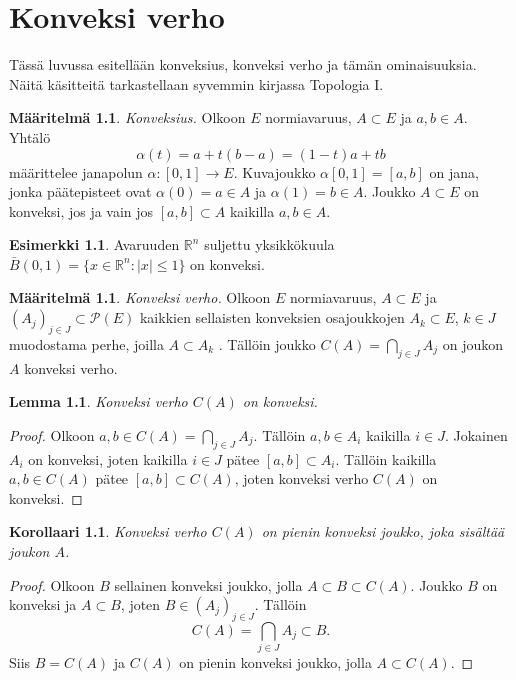 \documentclass[12pt,a4paper,leqno]{report}
\newcommand{\R}{\mathbb{R}}
\theoremstyle{plain}
\newtheorem{lem}[equation]{Lemma}
\newtheorem{kor}[equation]{Korollaari}
\theoremstyle{definition}
\newtheorem{maar}[equation]{Määritelmä}
\newtheorem{esim}[equation]{Esimerkki}
\theoremstyle{remark}
\begin{document}
\chapter{Konveksi verho}\label{konverho}
Tässä luvussa esitellään konveksius, konveksi verho ja tämän ominaisuuksia. Näitä käsitteitä tarkastellaan syvemmin kirjassa Topologia I.
\begin{maar}%
\emph{Konveksius.}
 Olkoon $E$ normiavaruus, $A\subset E$ ja $a,b\in A$. Yhtälö 
$$\alpha (t)=a+t(b-a)=(1-t)a+tb$$ 
määrittelee janapolun $\alpha \colon [0,1]\rightarrow E$. Kuvajoukko $\alpha [0,1] = [a,b]$ on jana, jonka päätepisteet ovat $\alpha (0)=a\in A$ ja $\alpha (1)=b\in A$. 
Joukko $A\subset E$ on konveksi, jos ja vain jos $[a,b]\subset A$ kaikilla $a,b\in A$.
\end{maar}
\begin{esim}
Avaruuden $\R ^n$ suljettu yksikkökuula $ \bar B(0,1)= \{x\in \R ^n \colon |x|\leq 1\}$ on konveksi.
\end{esim}
\begin{maar}\emph{Konveksi verho.} Olkoon $E$ normiavaruus, $A\subset E$ ja $(A_j)_{j\in J}\subset \mathcal{P}(E)$ 
kaikkien sellaisten konveksien osajoukkojen $A_k\subset E$, $k\in J$ muodostama perhe, joilla %
$A\subset A_k$%
. Tällöin joukko $C(A)=\bigcap_{j\in J} A_j$ on joukon $A$ konveksi verho. 
\end{maar}
\begin{lem} Konveksi verho $C(A)$ on konveksi.\end{lem} 
\begin{proof} Olkoon $a,b\in C(A)=\bigcap_{j\in J} A_j$. 
Tällöin $a,b\in A_i$ kaikilla $i\in J$. %
Jokainen $A_i$ on konveksi, joten kaikilla $i\in J$ pätee $[a,b]\subset A_i$.
Tällöin kaikilla $a,b\in C(A)$ pätee $[a,b] \subset C(A)$, joten konveksi verho $C(A)$ on konveksi.
\end{proof}
\begin{kor}\label{konv-pienin}Konveksi verho $C(A)$ on pienin konveksi joukko, joka sisältää joukon $A$.
\end{kor}
\begin{proof} Olkoon $B$ sellainen konveksi joukko, jolla $A\subset B\subset C(A)$. 
Joukko $B$ on konveksi ja $A\subset B$, joten $B\in (A_j)_{j\in J}$. 
Tällöin $$C(A)=\bigcap_{j\in J} A_j\subset B.$$
Siis $B= C(A)$ ja $C(A)$ on pienin konveksi joukko, jolla $A\subset C(A)$.
\end{proof}
\end{document}
